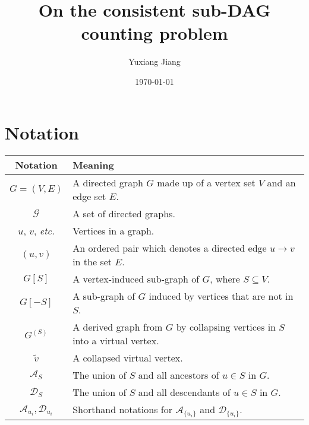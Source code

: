 \documentclass[11pt]{article}
\title{On the consistent sub-DAG counting problem}
\author{Yuxiang Jiang}
\date{\today}
\theoremstyle{definition}
\newcommand{\subg}[2]{\ensuremath{{#1}[#2]}}
\newcommand{\colg}[2]{\ensuremath{{#1}^{\left(#2\right)}}}
\newcommand{\ance}[1]{\ensuremath{\mathcal{A}_{#1}}}
\newcommand{\desc}[1]{\ensuremath{\mathcal{D}_{#1}}}
\begin{document}
\maketitle
\section{Notation}
    \begin{table}[htp!]
        \renewcommand\arraystretch{1.5}
        \begin{tabular}{c|l}
            \hline\hline
            Notation & Meaning \\ \hline
            $G = (V, E)$ & A directed graph $G$ made up of a vertex set $V$ and an edge set $E$.\\
            $\mathcal{G}$ & A set of directed graphs.\\
            $u$, $v$, \textit{etc.} & Vertices in a graph.\\
            $(u, v)$ & An ordered pair which denotes a directed edge $u \to v$ in the set $E$.\\
            $\subg{G}{S}$ & A vertex-induced sub-graph of $G$, where $S \subseteq V$.\\
            $\subg{G}{-S}$ & A sub-graph of $G$ induced by vertices that are not in $S$.\\
            $\colg{G}{S}$ & A derived graph from $G$ by collapsing vertices in $S$ into a virtual vertex.\\
            $\tilde{v}$ & A collapsed virtual vertex.\\
            $\ance{S}$ & The union of $S$ and all ancestors of $u \in S$ in $G$.\\
            $\desc{S}$ & The union of $S$ and all descendants of $u \in S$ in $G$.\\
            $\ance{u_i}, \desc{u_i}$ & Shorthand notations for $\ance{\{u_i\}}$
            and $\desc{\{u_i\}}$.\\
            \hline
        \end{tabular}
    \end{table}
\end{document}
